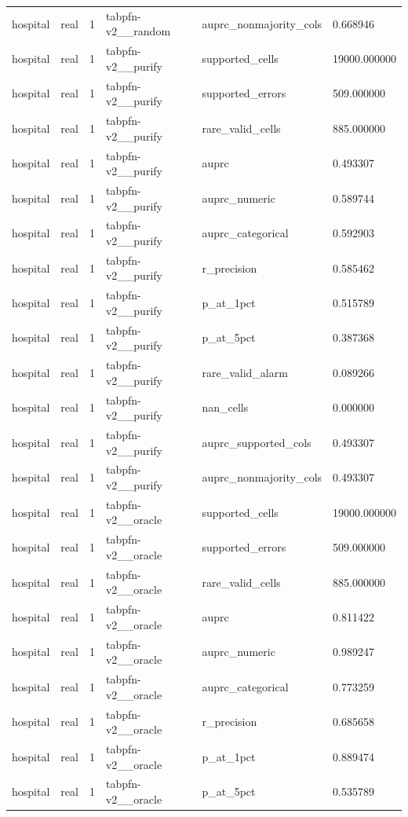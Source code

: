\begin{tabular}{llllll}
hospital & real & 1 & tabpfn-v2\_\_random & auprc\_nonmajority\_cols & 0.668946 \\
hospital & real & 1 & tabpfn-v2\_\_purify & supported\_cells & 19000.000000 \\
hospital & real & 1 & tabpfn-v2\_\_purify & supported\_errors & 509.000000 \\
hospital & real & 1 & tabpfn-v2\_\_purify & rare\_valid\_cells & 885.000000 \\
hospital & real & 1 & tabpfn-v2\_\_purify & auprc & 0.493307 \\
hospital & real & 1 & tabpfn-v2\_\_purify & auprc\_numeric & 0.589744 \\
hospital & real & 1 & tabpfn-v2\_\_purify & auprc\_categorical & 0.592903 \\
hospital & real & 1 & tabpfn-v2\_\_purify & r\_precision & 0.585462 \\
hospital & real & 1 & tabpfn-v2\_\_purify & p\_at\_1pct & 0.515789 \\
hospital & real & 1 & tabpfn-v2\_\_purify & p\_at\_5pct & 0.387368 \\
hospital & real & 1 & tabpfn-v2\_\_purify & rare\_valid\_alarm & 0.089266 \\
hospital & real & 1 & tabpfn-v2\_\_purify & nan\_cells & 0.000000 \\
hospital & real & 1 & tabpfn-v2\_\_purify & auprc\_supported\_cols & 0.493307 \\
hospital & real & 1 & tabpfn-v2\_\_purify & auprc\_nonmajority\_cols & 0.493307 \\
hospital & real & 1 & tabpfn-v2\_\_oracle & supported\_cells & 19000.000000 \\
hospital & real & 1 & tabpfn-v2\_\_oracle & supported\_errors & 509.000000 \\
hospital & real & 1 & tabpfn-v2\_\_oracle & rare\_valid\_cells & 885.000000 \\
hospital & real & 1 & tabpfn-v2\_\_oracle & auprc & 0.811422 \\
hospital & real & 1 & tabpfn-v2\_\_oracle & auprc\_numeric & 0.989247 \\
hospital & real & 1 & tabpfn-v2\_\_oracle & auprc\_categorical & 0.773259 \\
hospital & real & 1 & tabpfn-v2\_\_oracle & r\_precision & 0.685658 \\
hospital & real & 1 & tabpfn-v2\_\_oracle & p\_at\_1pct & 0.889474 \\
hospital & real & 1 & tabpfn-v2\_\_oracle & p\_at\_5pct & 0.535789 \\

\end{tabular}
